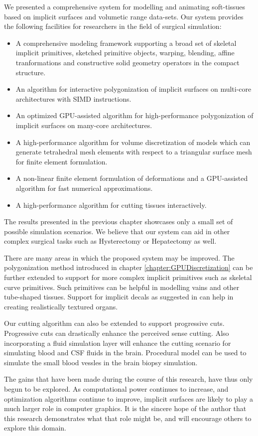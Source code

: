 \label{chapter:conclusion}
We presented a comprehensive system for modelling and animating soft-tissues based on implicit surfaces and volumetic range data-sets.
Our system provides the following facilities for researchers in the field of surgical simulation:

\begin{itemize}
 \item A comprehensive modeling framework supporting a broad set of skeletal implicit primitives, sketched primitive objects, warping, blending, 
 affine tranformations and constructive solid geometry operators in the compact \blob structure.
 \item An algorithm for interactive polygonization of implicit surfaces on multi-core architectures with SIMD instructions.
 \item An optimized GPU-assisted algorithm for high-performance polygonization of implicit surfaces on many-core architectures.
 \item A high-performance algorithm for volume discretization of \blob models which can generate tetrahedral mesh elements with respect to a triangular 
 surface mesh for finite element formulation.
 \item A non-linear finite element formulation of deformations and a GPU-assisted algorithm for fast numerical approximations.
 \item A high-performance algorithm for cutting tissues interactively. 
\end{itemize}

The results presented in the previous chapter showcases only a small set of possible simulation scenarios. We believe that our 
system can aid in other complex surgical tasks such as Hysterectomy or Hepatectomy as well. 

There are many areas in which the proposed system may be improved. The polygonization method introduced in chapter \ref{chapter:GPUDiscretization} can be further 
extended to support for more complex implicit primitives such as skeletal curve primitives. Such primitives can be helpful in modelling vains and other tube-shaped
tissues. Support for implicit decals as suggested in \cite{Schmidtb} can help in creating realistically textured organs. 

Our cutting algorithm can also be extended to support progressive cuts. Progressive cuts can drastically enhance the perceived sense cutting. 
Also incorporating a fluid simulation layer will enhance the cutting scenario for simulating blood and CSF fluids in the brain.
Procedural model can be used to simulate the small blood vessles in the brain biopsy simulation. 

The gains that have been made during the course of this research, have thus only begun to be explored. As computational
power continues to increase, and optimization algorithms continue to improve, implicit surfaces are likely to play a much larger role in 
computer graphics. It is the sincere hope of the author that this research demonstrates what that role might be, and will encourage others
to explore this domain.
